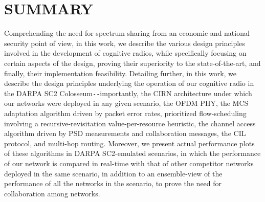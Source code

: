 %
%

\chapter{SUMMARY}
Comprehending the need for spectrum sharing from an economic and national security point of view, in this work, we describe the various design principles involved in the development of cognitive radios, while specifically focusing on certain aspects of the design, proving their superiority to the state-of-the-art, and finally, their implementation feasibility. Detailing further, in this work, we describe the design principles underlying the operation of our cognitive radio in the DARPA SC2 Colosseum\texttt{-{}-}importantly, the CIRN architecture under which our networks were deployed in any given scenario, the OFDM PHY, the MCS adaptation algorithm driven by packet error rates, prioritized flow-scheduling involving a recursive-revisitation value-per-resource heuristic, the channel access algorithm driven by PSD measurements and collaboration messages, the CIL protocol, and multi-hop routing. Moreover, we present actual performance plots of these algorithms in DARPA SC2-emulated scenarios, in which the performance of our network is compared in real-time with that of other competitor networks deployed in the same scenario, in addition to an ensemble-view of the performance of all the networks in the scenario, to prove the need for collaboration among networks.

